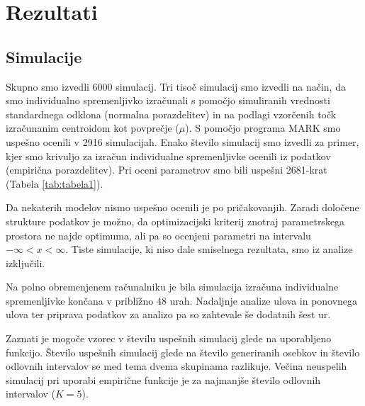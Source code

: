 \section{Rezultati}

\subsection{Simulacije}
Skupno smo izvedli 6000 simulacij. Tri tisoč simulacij smo izvedli na način, da smo individualno spremenljivko izračunali s pomočjo simuliranih vrednosti standardnega odklona (normalna porazdelitev) in na podlagi vzorčenih točk izračunanim centroidom kot povprečje ($\mu$). S pomočjo programa MARK smo uspešno ocenili v 2916 simulacijah.
Enako število simulacij smo izvedli za primer, kjer smo krivuljo za izračun individualne spremenljivke ocenili iz podatkov (empirična porazdelitev). Pri oceni parametrov smo bili uspešni 2681-krat (Tabela \ref{tab:tabela1}).

Da nekaterih modelov nismo uspešno ocenili je po pričakovanjih. Zaradi določene strukture podatkov je možno, da optimizacijski kriterij znotraj parametrskega prostora ne najde optimuma, ali pa so ocenjeni parametri na intervalu $- \infty < x < \infty$. Tiste simulacije, ki niso dale smiselnega rezultata, smo iz analize izključili.

Na polno obremenjenem računalniku je bila simulacija izračuna individualne spremenljivke končana v približno 48 urah. Nadaljnje analize ulova in ponovnega ulova ter priprava podatkov za analizo pa so zahtevale še dodatnih šest ur.

Zaznati je mogoče vzorec v številu uspešnih simulacij glede na uporabljeno funkcijo. Število uspešnih simulacij glede na število generiranih osebkov in število odlovnih intervalov se med tema dvema skupinama razlikuje. Večina neuspelih simulacij pri uporabi empirične funkcije je za najmanjše število odlovnih intervalov ($K=5$).

